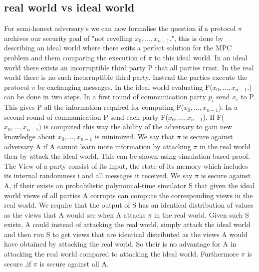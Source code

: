 \subsection{real world vs ideal world }
For semi-honest adversary's we can now formalise the question if a protocol $ \pi $ archives our security goal of "not revelling $ x_0,\dots,x_{n-1}. $", this is done by describing an ideal world where there exits a perfect solution for the MPC problem and them comparing the execution of $ \pi $ to this ideal world. In an ideal world there exists an incorruptible third party P that all parties trust. In the real world there is no such incorruptible third party. Instead the parties execute the protocol $ \pi $ be exchanging messages.
In the ideal world evaluating F($ x_0,\dots,x_{n-1}. $) can be done in two steps. In a first round of communication party $ p_i $ send $x_i $ to P.
This gives P all the information required for computing F($ x_0,\dots,x_{n-1} $). In a second round of communication P send each party F($ x_0,\dots,x_{n-1} $).
If F($ x_0,\dots,x_{n-1}) $ is computed this way the ability of the adversary to gain new knowledge about $ x_0,\dots,x_{n-1} $ is minimized. We say that  $ \pi $ is secure against adversary A if A cannot learn more information by attacking $ \pi $ in the real world then by attack the ideal world. This can be shown using simulation based proof. 
The View of a party consist of its input, the state of its memory which includes its internal randomness i and all messages it received. 
We say $ \pi $ is secure against A,  if their exists an probabilistic polynomial-time simulator S that given the ideal world views of all parties A corrupts can compute the corresponding views in the real world. We require that the output of S has an identical distribution of values as the views that A would see when A attacks $ \pi $ in the real world. Given such S exists, A could instead of attacking the real world, simply attack the ideal world and then run S to get views that are identical distributed as the views A would have obtained by attacking the real world. So their is no advantage for A in attacking the real world compared to attacking the ideal world. Furthermore $ \pi $ is secure ,if $ \pi $ is secure against all A.       
      

